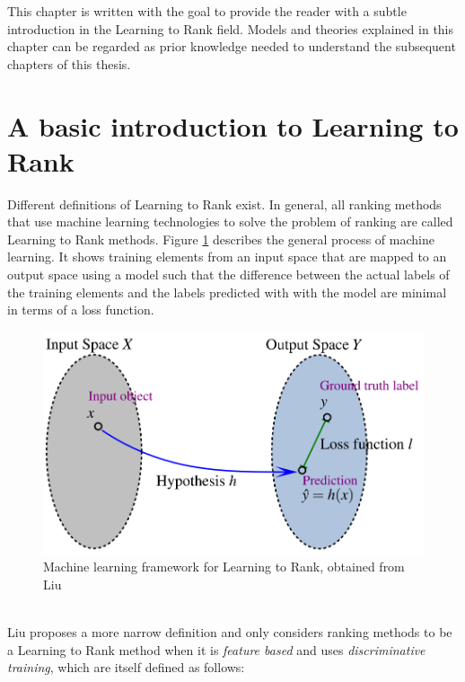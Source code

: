 This chapter is written with the goal to provide the reader with a subtle introduction in the Learning to Rank field. Models and theories explained in this chapter can be regarded as prior knowledge needed to understand the subsequent chapters of this thesis.
\section{A basic introduction to Learning to Rank}
Different definitions of Learning to Rank exist. In general, all ranking methods that use machine learning technologies to solve the problem of ranking are called Learning to Rank methods. Figure \ref{fig:discriminative_training} describes the general process of machine learning. It shows training elements from an input space that are mapped to an output space using a model such that the difference between the actual labels of the training elements and the labels predicted with with the model are minimal in terms of a loss function.
\begin{figure}[!h]
\includegraphics[scale=0.26]{gfx/descriminative_training}
\caption{Machine learning framework for Learning to Rank, obtained from Liu \cite{Liu2007}}
\label{fig:discriminative_training}
\end{figure}\\
Liu \cite{Liu2007} proposes a more narrow definition and only considers ranking methods to be a Learning to Rank method when it is \emph{feature based} and uses \emph{discriminative training}, which are itself defined as follows:
